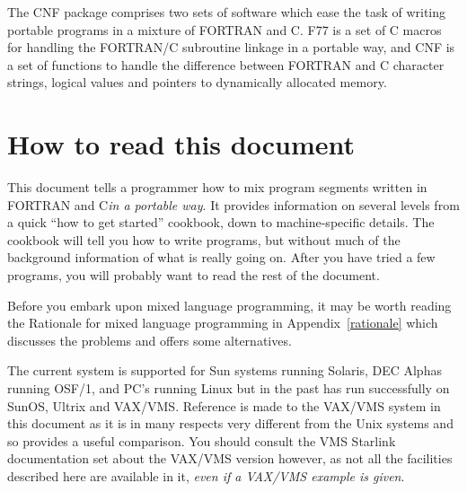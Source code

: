 \documentclass[twoside,11pt]{article}
\makeatletter
\newcommand{\stardocinitials}  {SUN}
\newcommand{\stardocnumber}    {209.10}
\newcommand{\stardocabstract}  {
The CNF package comprises two sets of software which ease the task of writing
portable programs in a mixture of FORTRAN and C\@.
F77 is a set of C macros for handling the FORTRAN/C subroutine linkage in a 
portable way, and CNF is a set of functions to handle the difference between
FORTRAN and C character strings, logical values and pointers to
dynamically allocated memory.}
\newcommand{\stardocname}{\stardocinitials /\stardocnumber}
\newcommand{\htmlref}[2]{#1}
\newenvironment{latexonly}{}{}
\newcommand{\latex}[1]{#1}
\newcommand{\xlabel}[1]{}
\renewcommand{\_}{\texttt{\symbol{95}}}
\renewcommand{\thepage}{\roman{page}}
\makeatother
\begin{document}
\stardocabstract
  \newpage
  \begin{latexonly}
    \setlength{\parskip}{0mm}
    \tableofcontents
    \setlength{\parskip}{\medskipamount}
    \markboth{\stardocname}{\stardocname}
  \end{latexonly}
\cleardoublepage
\renewcommand{\thepage}{\arabic{page}}
\setcounter{page}{1}

\section{\xlabel{how_to_read_this_document}\label{how_to}How to read this document}

This document tells a programmer how to mix program segments written in FORTRAN
and C\@ \textit{in a portable way}. 
It provides information on several levels from a quick ``how to get
started'' cookbook, down to machine-specific details. 
The cookbook will tell you how to
write programs, but without much of the background information of what is
really going on. After you have tried a few programs, you will probably want to
read the rest of the document.

Before you embark upon mixed language programming, it may be worth reading the
\htmlref{Rationale for mixed language programming}{rationale}
\latex{ in Appendix~\ref{rationale}} which discusses the problems and 
offers some alternatives.

The current system is supported for Sun systems running Solaris, DEC Alphas 
running OSF/1, and PC's running Linux but in the past has run successfully on 
SunOS, Ultrix and VAX/VMS. 
Reference is made to the VAX/VMS system in this document as it is in
many respects very different from the Unix systems and so provides a useful
comparison. You should consult the VMS Starlink documentation set
about the VAX/VMS version however, as not all the facilities described here are 
available in it, \textit{even if a VAX/VMS example is given}.
\end{document}
